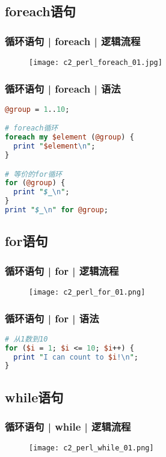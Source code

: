 \subsection{foreach语句}
\begin{frame}
  \frametitle{循环语句 | foreach | 逻辑流程}
  \begin{figure}
    \centering
    \texttt{[image: c2\_perl\_foreach\_01.jpg]}
  \end{figure}
\end{frame}

\begin{frame}[fragile]
  \frametitle{循环语句 | foreach | \alert{语法}}
\begin{lstlisting}[language=Perl]
@group = 1..10;

# foreach循环
foreach my $element (@group) {
  print "$element\n";
}

# 等价的for循环
for (@group) {
  print "$_\n";
}
print "$_\n" for @group;
\end{lstlisting}
\end{frame}

\subsection{for语句}
\begin{frame}
  \frametitle{循环语句 | for | 逻辑流程}
  \begin{figure}
    \centering
    \texttt{[image: c2\_perl\_for\_01.png]}
  \end{figure}
\end{frame}

\begin{frame}[fragile]
  \frametitle{循环语句 | for | \alert{语法}}
\begin{lstlisting}[language=Perl]
# 从1数到10
for ($i = 1; $i <= 10; $i++) {
  print "I can count to $i!\n";
}
\end{lstlisting}
\end{frame}

\subsection{while语句}
\begin{frame}
  \frametitle{循环语句 | while | 逻辑流程}
  \begin{figure}
    \centering
    \texttt{[image: c2\_perl\_while\_01.png]}
  \end{figure}
\end{frame}


